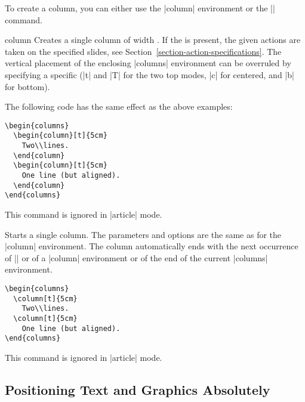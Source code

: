 To create a column, you can either use the |column| environment or the |\column| command.

\begin{environment}{{column}}
  Creates a single column of width . If the  is present, the given actions are taken on the specified slides, see Section~\ref{section-action-specifications}. The vertical placement of the enclosing |columns| environment can be overruled by specifying a specific  (|t| and |T| for the two top modes, |c| for centered, and |b| for bottom).

  \example
  The following code has the same effect as the above examples:
\begin{verbatim}
\begin{columns}
  \begin{column}[t]{5cm}
    Two\\lines.
  \end{column}
  \begin{column}[t]{5cm}
    One line (but aligned).
  \end{column}
\end{columns}
\end{verbatim}

  \articlenote
  This command is ignored in |article| mode.

\end{environment}

\begin{command}{{\column}}
  Starts a single column. The parameters and options are the same as for the |column| environment. The column automatically ends with the next occurrence of |\column| or of a |column| environment or of the end of the current |columns| environment.

  \example
\begin{verbatim}
\begin{columns}
  \column[t]{5cm}
    Two\\lines.
  \column[t]{5cm}
    One line (but aligned).
\end{columns}
\end{verbatim}

  \articlenote
  This command is ignored in |article| mode.

\end{command}


\subsection{Positioning Text and Graphics Absolutely}

